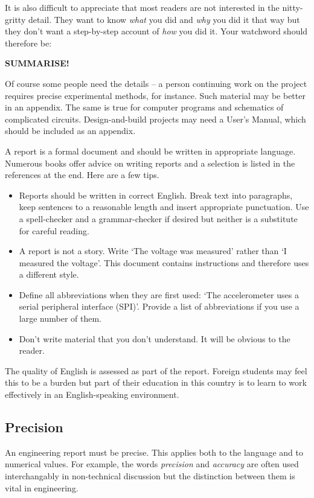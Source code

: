 \documentclass[a4paper,12pt]{article}
\begin{document}
It is also difficult to appreciate that most readers are not interested in the nitty-gritty detail. They want to know \emph{what} you did and \emph{why} you did it that way but they don't want a step-by-step account of \emph{how} you did it. Your watchword should therefore be:
\begin{center}
\textbf{SUMMARISE!}
\end{center}
Of course some people need the details -- a person continuing work on the project requires precise experimental methods, for instance. Such material may be better in an appendix. The same is true for computer programs and schematics of complicated circuits. Design-and-build projects may need a User's Manual, which should be included as an appendix. 

A report is a formal document and should be written in appropriate language. Numerous books offer advice on writing reports and a selection \cite{jve05,mkm06,dfb09,tmy05} is listed in the references at the end. Here are a few tips.
\begin{itemize}
\item
Reports should be written in correct English. Break text into paragraphs, keep sentences to a reasonable length and insert appropriate punctuation. Use a spell-checker and a grammar-checker if desired but neither is a substitute for careful reading. 
\item
A report is not a story. 
Write `The voltage was measured' rather than `I measured the voltage'. This document contains instructions and therefore uses a different style.
\item
Define all abbreviations when they are first used: `The accelerometer uses a serial peripheral interface (SPI)'. Provide a list of abbreviations if you use a large number of them.
\item
Don't write material that you don't understand. It will be obvious to the reader.
\end{itemize}
The quality of English is assessed as part of the report. Foreign students may feel this to be a burden but part of their education in this country is to learn to work effectively in an English-speaking environment. 

\subsection{Precision}

An engineering report must be precise. This applies both to the language and to numerical values. For example, the words \emph{precision} and \emph{accuracy} are often used interchangably in non-technical discussion but the distinction between them is vital in engineering.
\end{document}
